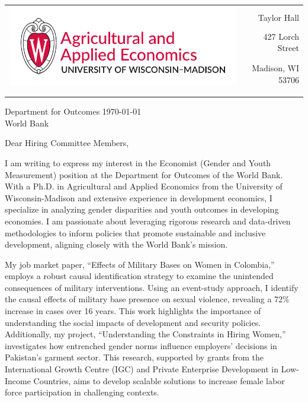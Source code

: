 \documentclass[12pt]{letter}
\begin{document}
\begin{tabularx}{\textwidth}{Xr}
\multirow{4}{*}{\includegraphics[height=3\baselineskip]{logo_cropped.pdf}} &  \\
& Taylor Hall \\
& 427 Lorch Street \\
& Madison, WI 53706 \\
[-1.8ex]\\
\\
\end{tabularx}


Department for Outcomes \hfill \today \\
World Bank
\medskip

Dear Hiring Committee Members,

I am writing to express my interest in the Economist (Gender and Youth Measurement) position at the Department for Outcomes of the World Bank. 
With a Ph.D. in Agricultural and Applied Economics from the University of Wisconsin-Madison and extensive experience in development economics, 
I specialize in analyzing gender disparities and youth outcomes in developing economies. 
I am passionate about leveraging rigorous research and data-driven methodologies to inform policies that promote sustainable and inclusive development, 
aligning closely with the World Bank's mission.

My job market paper, “Effects of Military Bases on Women in Colombia,” employs a robust causal identification strategy to examine 
the unintended consequences of military interventions. Using an event-study approach, I identify the causal effects of military base presence on sexual violence, 
revealing a 72\% increase in cases over 16 years. This work highlights the importance of understanding the social impacts of development and security policies. 
Additionally, my project, “Understanding the Constraints in Hiring Women,” investigates how entrenched gender norms influence employers' decisions in Pakistan's 
garment sector. This research, supported by grants from the International Growth Centre (IGC) and Private Enterprise Development in Low-Income Countries, 
aims to develop scalable solutions to increase female labor force participation in challenging contexts.
\end{document}
